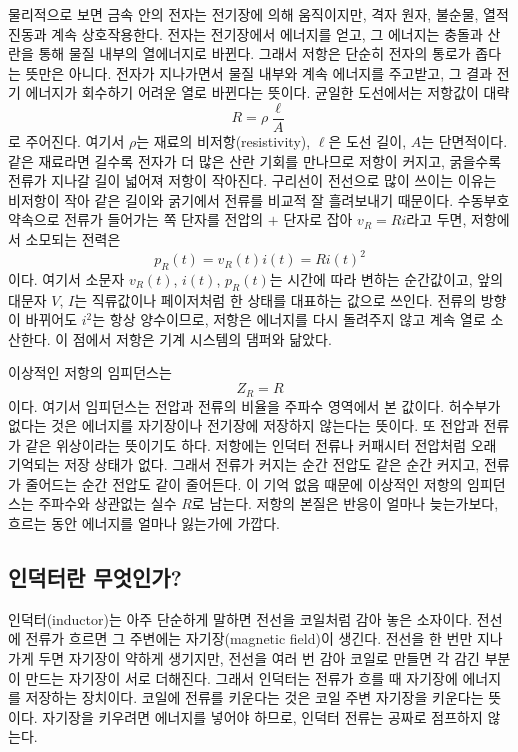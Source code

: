 물리적으로 보면 금속 안의 전자는 전기장에 의해 움직이지만, 격자 원자, 불순물, 열적 진동과 계속 상호작용한다.
전자는 전기장에서 에너지를 얻고, 그 에너지는 충돌과 산란을 통해 물질 내부의 열에너지로 바뀐다.
그래서 저항은 단순히 전자의 통로가 좁다는 뜻만은 아니다.
전자가 지나가면서 물질 내부와 계속 에너지를 주고받고, 그 결과 전기 에너지가 회수하기 어려운 열로 바뀐다는 뜻이다.
균일한 도선에서는 저항값이 대략
\begin{equation}
  R = \rho \frac{\ell}{A}
\end{equation}
로 주어진다.
여기서 $\rho$는 재료의 비저항(resistivity), $\ell$은 도선 길이, $A$는 단면적이다.
같은 재료라면 길수록 전자가 더 많은 산란 기회를 만나므로 저항이 커지고, 굵을수록 전류가 지나갈 길이 넓어져 저항이 작아진다.
구리선이 전선으로 많이 쓰이는 이유는 비저항이 작아 같은 길이와 굵기에서 전류를 비교적 잘 흘려보내기 때문이다.
수동부호약속으로 전류가 들어가는 쪽 단자를 전압의 $+$ 단자로 잡아 $v_R=Ri$라고 두면, 저항에서 소모되는 전력은
\begin{equation}
  p_R(t)=v_R(t)i(t)=Ri(t)^2
\end{equation}
이다.
여기서 소문자 $v_R(t)$, $i(t)$, $p_R(t)$는 시간에 따라 변하는 순간값이고, 앞의 대문자 $V$, $I$는 직류값이나 페이저처럼 한 상태를 대표하는 값으로 쓰인다.
전류의 방향이 바뀌어도 $i^2$는 항상 양수이므로, 저항은 에너지를 다시 돌려주지 않고 계속 열로 소산한다.
이 점에서 저항은 기계 시스템의 댐퍼와 닮았다.

이상적인 저항의 임피던스는
\begin{equation}
  Z_R=R
\end{equation}
이다.
여기서 임피던스는 전압과 전류의 비율을 주파수 영역에서 본 값이다.
허수부가 없다는 것은 에너지를 자기장이나 전기장에 저장하지 않는다는 뜻이다.
또 전압과 전류가 같은 위상이라는 뜻이기도 하다.
저항에는 인덕터 전류나 커패시터 전압처럼 오래 기억되는 저장 상태가 없다.
그래서 전류가 커지는 순간 전압도 같은 순간 커지고, 전류가 줄어드는 순간 전압도 같이 줄어든다.
이 기억 없음 때문에 이상적인 저항의 임피던스는 주파수와 상관없는 실수 $R$로 남는다.
저항의 본질은 반응이 얼마나 늦는가보다, 흐르는 동안 에너지를 얼마나 잃는가에 가깝다.

\subsection{인덕터란 무엇인가?}

인덕터(inductor)는 아주 단순하게 말하면 전선을 코일처럼 감아 놓은 소자이다.
전선에 전류가 흐르면 그 주변에는 자기장(magnetic field)이 생긴다.
전선을 한 번만 지나가게 두면 자기장이 약하게 생기지만, 전선을 여러 번 감아 코일로 만들면 각 감긴 부분이 만드는 자기장이 서로 더해진다.
그래서 인덕터는 전류가 흐를 때 자기장에 에너지를 저장하는 장치이다.
코일에 전류를 키운다는 것은 코일 주변 자기장을 키운다는 뜻이다.
자기장을 키우려면 에너지를 넣어야 하므로, 인덕터 전류는 공짜로 점프하지 않는다.

